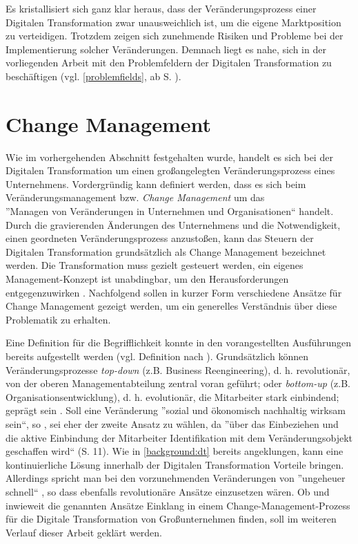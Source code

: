 Es kristallisiert sich ganz klar heraus, dass der Veränderungsprozess einer Digitalen Transformation zwar unausweichlich ist, um die eigene Marktposition zu verteidigen. Trotzdem zeigen sich zunehmende Risiken und Probleme bei der Implementierung solcher Veränderungen. Demnach liegt es nahe, sich in der vorliegenden Arbeit mit den Problemfeldern der Digitalen Transformation zu beschäftigen (vgl. \ref{problemfields}, ab S. \pageref{problemfields}).

\section{Change Management}
\label{background:change}


Wie im vorhergehenden Abschnitt festgehalten wurde, handelt es sich bei der Digitalen Transformation um einen großangelegten Veränderungsprozess eines Unternehmens. Vordergründig kann definiert werden, dass es sich beim Veränderungsmanagement bzw. \textit{Change Management} um das \\ ''Managen von Veränderungen in Unternehmen und Organisationen`` \cite[S. 10]{kaune_change_2016} handelt. Durch die gravierenden Änderungen des Unternehmens und die Notwendigkeit, einen geordneten Veränderungsprozess anzustoßen, kann das Steuern der Digitalen Transformation grundsätzlich als Change Management bezeichnet werden. Die Transformation muss gezielt gesteuert werden, ein eigenes Management-Konzept ist unabdingbar, um den Herausforderungen entgegenzuwirken \cite[S. 19]{hess_digitale_2019}. Nachfolgend sollen in kurzer Form verschiedene Ansätze für Change Management gezeigt werden, um ein generelles Verständnis über diese Problematik zu erhalten.

Eine Definition für die Begrifflichkeit konnte in den vorangestellten Ausführungen bereits aufgestellt werden (vgl. Definition nach ). Grundsätzlich können Veränderungsprozesse \textit{top-down} (z.B. Business Reengineering), d. h. revolutionär, von der oberen Managementabteilung zentral voran geführt; oder \textit{bottom-up} (z.B. Organisationsentwicklung), d. h. evolutionär, die Mitarbeiter stark einbindend; geprägt sein \cite[S. 10]{kaune_change_2016}. Soll eine Veränderung ''sozial und ökonomisch nachhaltig wirksam sein``, so , sei eher der zweite Ansatz zu wählen, da ''über
das Einbeziehen und die aktive Einbindung der Mitarbeiter Identifikation mit dem Veränderungsobjekt geschaffen wird`` (S. 11). Wie in \ref{background:dt} bereits angeklungen, kann eine kontinuierliche Lösung innerhalb der Digitalen Transformation Vorteile bringen. Allerdings spricht man bei den vorzunehmenden Veränderungen von ''ungeheuer schnell``  \cite[S. 10]{oswald_digitale_2018} , so dass ebenfalls revolutionäre Ansätze einzusetzen wären. Ob und inwieweit die genannten Ansätze Einklang in einem Change-Management-Prozess für die Digitale Transformation von Großunternehmen finden, soll im weiteren Verlauf dieser Arbeit geklärt werden.

